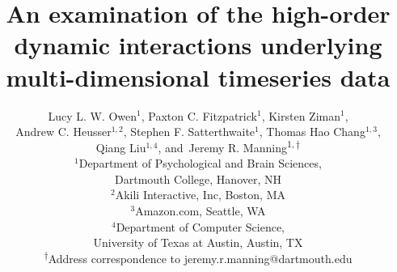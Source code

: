 \documentclass[english]{article}
\begin{document}
\title{An examination of the high-order dynamic interactions underlying multi-dimensional timeseries data}
\author{Lucy L. W. Owen$^1$,
Paxton C. Fitzpatrick$^1$,
Kirsten Ziman$^1$,\\
Andrew C. Heusser$^{1,2}$,
Stephen F. Satterthwaite$^1$,
Thomas Hao Chang$^{1,3}$,\\
Qiang Liu$^{1,4}$,
and\
Jeremy R. Manning\textsuperscript{$1, \dagger$}\\
[0.1in]$^1$Department of Psychological and Brain Sciences,\\Dartmouth
College, Hanover, NH\\
$^2$Akili Interactive, Inc, Boston, MA\\
$^3$Amazon.com, Seattle, WA\\
$^4$Department of Computer Science,\\University of Texas at Austin,
Austin, TX\\
\textsuperscript{$\dagger$}Address correspondence to jeremy.r.manning@dartmouth.edu}

\begin{titlepage}
\thispagestyle{fancy}   




\end{titlepage}




\maketitle
\end{document}
